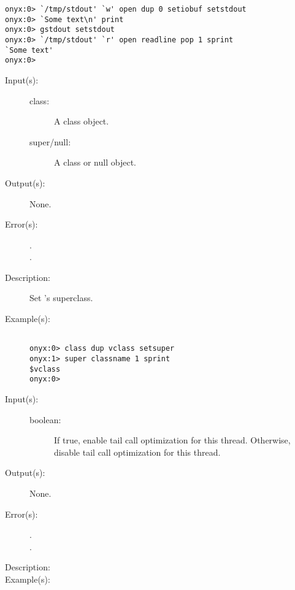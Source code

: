 \begin{description}
\begin{description}
\begin{verbatim}
onyx:0> `/tmp/stdout' `w' open dup 0 setiobuf setstdout
onyx:0> `Some text\n' print
onyx:0> gstdout setstdout
onyx:0> `/tmp/stdout' `r' open readline pop 1 sprint
`Some text'
onyx:0>
		\end{verbatim}
	\end{description}
\label{systemdict:setsuper}
\item[{\onyxop{class super/null}{setsuper}{--}}: ]
	\begin{description}\item[]
	\item[Input(s): ]
		\begin{description}\item[]
		\item[class: ]
			A class object.
		\item[super/null: ]
			A class or null object.
		\end{description}
	\item[Output(s): ] None.
	\item[Error(s): ]
		\begin{description}\item[]
		\item[.]
		\item[.]
		\end{description}
	\item[Description: ]
		Set 's superclass.
	\item[Example(s): ]\begin{verbatim}

onyx:0> class dup vclass setsuper
onyx:1> super classname 1 sprint
$vclass
onyx:0>
		\end{verbatim}
	\end{description}
\label{systemdict:settailopt}
\item[{\onyxop{boolean}{settailopt}{--}}: ]
	\begin{description}\item[]
	\item[Input(s): ]
		\begin{description}\item[]
		\item[boolean: ]
			If true, enable tail call optimization for this thread.
			Otherwise, disable tail call optimization for this
			thread.
		\end{description}
	\item[Output(s): ] None.
	\item[Error(s): ]
		\begin{description}\item[]
		\item[.]
		\item[.]
		\end{description}
	\item[Description: ]
	\item[Example(s): ]\begin{verbatim}


\end{verbatim}
\end{description}
\end{description}

